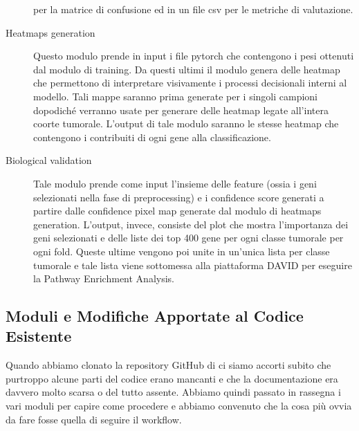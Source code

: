 \begin{description}
                                  per la matrice di confusione ed in un file csv per le metriche di valutazione.
    \item[Heatmaps generation] Questo modulo prende in input i file pytorch che contengono i pesi ottenuti dal modulo 
                               di training.
                               Da questi ultimi il modulo genera delle heatmap che permettono di interpretare
                               visivamente i processi decisionali interni al modello. Tali mappe saranno prima 
                               generate per i singoli campioni dopodiché verranno usate per generare delle
                               heatmap legate all'intera coorte tumorale.
                               L'output di tale modulo saranno le stesse heatmap che contengono i contribuiti di
                               ogni gene alla classificazione.
    \item[Biological validation] Tale modulo prende come input l'insieme delle feature (ossia i geni selezionati 
                                 nella fase di preprocessing) e i confidence score generati a partire dalle 
                                 confidence pixel map generate dal modulo di heatmaps generation.
                                 L'output, invece, consiste del plot che mostra l'importanza dei geni selezionati 
                                 e delle liste dei top 400 gene per ogni classe tumorale per ogni fold. 
                                 Queste ultime vengono poi unite in un'unica lista per classe tumorale e tale 
                                 lista viene sottomessa alla piattaforma DAVID per eseguire la Pathway Enrichment
                                 Analysis. 
\end{description}

\subsection{Moduli e Modifiche Apportate al Codice Esistente}
Quando abbiamo clonato la repository GitHub di \cite{lyu2018deep} ci siamo accorti subito che purtroppo
alcune parti del codice erano mancanti e che la documentazione era davvero molto scarsa o del tutto assente.
Abbiamo quindi passato in rassegna i vari moduli per capire come procedere e abbiamo convenuto che la cosa più
ovvia da fare fosse quella di seguire il workflow.

